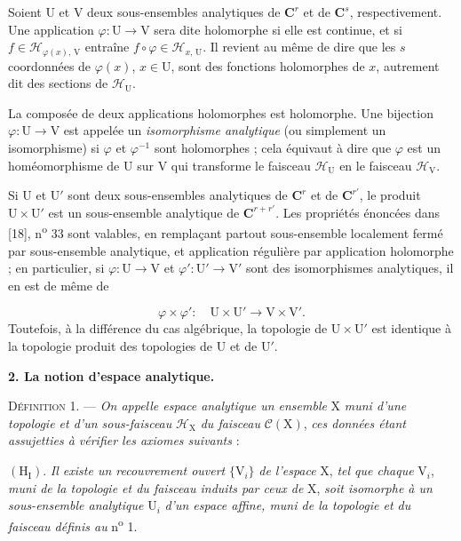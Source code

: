 Soient $\mathrm{U}$ et $\mathrm{V}$ deux sous-ensembles analytiques de $\mathbf{C}^r$ et de $\mathbf{C}^s$, respectivement. Une application $\varphi : \mathrm{U} \to \mathrm{V}$ sera dite holomorphe si elle est continue, et si $f \in \mathcal{H}_{\varphi(x),\,\mathrm{V}}$ entraîne $f \circ \varphi \in \mathcal{H}_{x,\,\mathrm{U}}$.
%
%
%
Il revient au même de dire que les $s$ coordonnées de $\varphi(x)$, $x \in \mathrm{U}$, sont des fonctions holomorphes de $x$, autrement dit des sections de $\mathcal{H}_{\mathrm{U}}$.

La composée de deux applications holomorphes est holomorphe. Une bijection $\varphi : \mathrm{U} \to \mathrm{V}$ est appelée un \emph{isomorphisme analytique} (ou simplement un isomorphisme) si $\varphi$ et $\varphi^{-1}$ sont holomorphes ; cela équivaut à dire que $\varphi$ est un homéomorphisme de $\mathrm{U}$ sur $\mathrm{V}$ qui transforme le faisceau $\mathcal{H}_{\mathrm{U}}$ en le faisceau $\mathcal{H}_{\mathrm{V}}$.

Si $\mathrm{U}$ et $\mathrm{U}'$ sont deux sous-ensembles analytiques de $\mathbf{C}^r$ et de $\mathbf{C}^{r'}$, le produit $\mathrm{U} \times \mathrm{U}'$ est un sous-ensemble analytique de $\mathbf{C}^{r+r'}$. Les propriétés énoncées dans [18], n\textsuperscript{o} 33 sont valables, en remplaçant partout sous-ensemble localement fermé par sous-ensemble analytique, et application régulière par application holomorphe ; en particulier, si $\varphi : \mathrm{U} \to \mathrm{V}$ et $\varphi' : \mathrm{U}' \to \mathrm{V}'$ sont des isomorphismes analytiques, il en est de même de

\begin{equation*}
\varphi \times \varphi' : \quad \mathrm{U} \times \mathrm{U}' \to \mathrm{V} \times \mathrm{V}'.
\end{equation*}
Toutefois, à la différence du cas algébrique, la topologie de $\mathrm{U} \times \mathrm{U}'$ est identique à la topologie produit des topologies de $\mathrm{U}$ et de $\mathrm{U}'$.


\textbf{2. La notion d'espace analytique.}

\textsc{Définition} 1. — \emph{On appelle espace analytique un ensemble} $\mathrm{X}$ \emph{muni d'une topologie et d'un sous-faisceau} $\mathcal{H}_{\mathrm{X}}$ \emph{du faisceau} $\mathcal{C}(\mathrm{X})$, \emph{ces données étant assujetties à vérifier les axiomes suivants} :

$(\mathrm{H}_{\mathrm{I}})$. \emph{Il existe un recouvrement ouvert} $\{\mathrm{V}_i\}$ \emph{de l'espace} $\mathrm{X}$, \emph{tel que chaque} $\mathrm{V}_i$, \emph{muni de la topologie et du faisceau induits par ceux de} $\mathrm{X}$, \emph{soit isomorphe à un sous-ensemble analytique} $\mathrm{U}_i$ \emph{d'un espace affine, muni de la topologie et du faisceau définis au} n\textsuperscript{o} 1.

